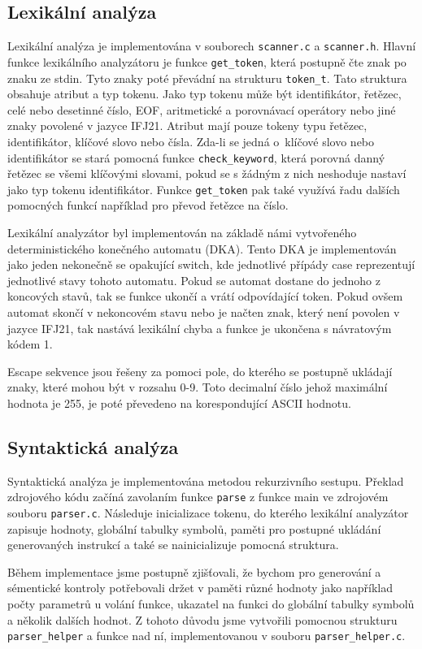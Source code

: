 \documentclass[11pt]{article}
\begin{document}
\subsection{Lexikální analýza}
Lexikální analýza je implementována v souborech \texttt{scanner.c} a \texttt{scanner.h}. Hlavní funkce lexikálního analyzátoru je funkce \texttt{get\_token},
která postupně čte znak po znaku ze stdin. Tyto znaky poté převádní na strukturu \texttt{token\_t}. Tato struktura obsahuje atribut a typ tokenu.
Jako typ tokenu může být identifikátor, řetězec, celé nebo desetinné číslo, EOF, aritmetické a porovnávací operátory nebo jiné znaky povolené v jazyce IFJ21.
Atribut mají pouze tokeny typu řetězec, identifikátor, klíčové slovo nebo čísla. Zda-li se jedná o~klíčové slovo nebo identifikátor
se stará pomocná funkce \texttt{check\_keyword}, která porovná danný řetězec se všemi klíčovými slovami, pokud se s žádným z nich neshoduje nastaví jako typ
tokenu identifikátor. Funkce \texttt{get\_token} pak také využívá řadu dalších pomocných funkcí například pro převod řetězce na číslo.

Lexikální analyzátor byl implementován na základě námi vytvořeného deterministického konečného automatu (DKA).
Tento DKA je implementován jako jeden nekonečně se opakující switch, kde jednotlivé přípády case reprezentují jednotlivé stavy tohoto automatu.
Pokud se automat dostane do jednoho z koncových stavů, tak se funkce ukončí a vrátí odpovídající token. Pokud ovšem
automat skončí v nekoncovém stavu nebo je načten znak, který není povolen v jazyce IFJ21, tak nastává lexikální chyba a funkce je ukončena s návratovým kódem 1.

Escape sekvence jsou řešeny za pomoci pole, do kterého se postupně ukládají znaky, které mohou být v rozsahu 0-9. Toto decimalní číslo jehož maximální
hodnota je 255, je poté převedeno na korespondující ASCII hodnotu.

\subsection{Syntaktická analýza}
Syntaktická analýza je implementována metodou rekurzivního sestupu. Překlad zdrojového kódu začíná zavolaním funkce
\texttt{parse} z funkce main ve zdrojovém souboru \texttt{parser.c}. Následuje inicializace tokenu, do kterého lexikální analyzátor
zapisuje hodnoty, globální tabulky symbolů, paměti pro postupné ukládání generovaných instrukcí a také se nainicializuje pomocná struktura.

Během implementace jsme postupně zjišťovali,
že bychom pro generování a sémentické kontroly potřebovali držet v paměti různé hodnoty jako například počty parametrů u volání funkce,
ukazatel na funkci do globální tabulky symbolů a několik dalších hodnot. Z tohoto důvodu jsme vytvořili pomocnou strukturu
\texttt{parser\_helper} a funkce nad ní, implementovanou v souboru \texttt{parser\_helper.c}.
\end{document}
